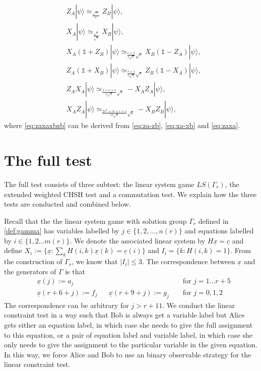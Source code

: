 \documentclass[11pt,letterpaper]{article}
\newcommand{\ket}[1]{|#1\rangle}
\newcommand{\1}{\mathbb{1}}
\newcommand{\LS}{LS}
\newcommand{\nr}{n(r)}
\newcommand{\mr}{m(r)}
\newcommand{\ux}{\underline{x}}
\newcommand{\uc}{\underline{c}}
\newcommand{\se}{\sqrt{\epsilon}}
\newcommand{\appd}[1]{\simeq_{#1}}
\theoremstyle{definition}
\begin{document}
\begin{align}
	\label{eq:za-zb}& Z_A\ket{\psi} \appd{\frac{\sqrt{s\epsilon}}{c}} Z_B\ket{\psi},\\
	\label{eq:xa-xb}&X_A\ket{\psi} \appd{\frac{\sqrt{\epsilon}}{\sqrt{s}}} X_B \ket{\psi}, \\
	\label{eq:xazb}&X_A(\1+Z_B)\ket{\psi} \appd{\frac{c+1}{c\sqrt{s}} \se} X_B(\1-Z_A) \ket{\psi},\\
	\label{eq:zaxb}&Z_A(\1+X_B)\ket{\psi} \appd{ \frac{s+1}{c\sqrt{s}} \se} Z_B(\1-X_A) \ket{\psi},\\
	\label{eq:zaxa}&Z_AX_A\ket{\psi} \appd{\frac{1+c+s}{c\sqrt{s}} \se} -X_AZ_A \ket{\psi},\\
	\label{eq:zaxaxbzb}&X_AZ_A \ket{\psi} \appd{\frac{2s^2+cs+c+s}{cs\sqrt{s}} \sqrt{\epsilon}} -X_BZ_B \ket{\psi},
\end{align}
where \cref{eq:zaxaxbzb} can be derived from \cref{eq:za-zb}, \cref{eq:xa-xb} and \cref{eq:zaxa}.
\section{The full test}
\label{sec:full_test}
The full test consists of three subtest: the linear system game $\LS(\Gamma_r)$,
the extended weighted CHSH test and a commutation test. We explain how the three tests are conducted and
combined below.

Recall that the the linear system game with solution group $\Gamma_r$ defined in \cref{def:gamma} has variables labelled by $j \in \{1,2,\dots,\nr\}$ and
equations labelled by $i \in \{1, 2 \dots \mr\}$.
We denote the associated linear system by $H\underline{x} = \uc$ and
define $X_i := \{ \ux : \sum_{k} H(i,k)\ux(k) = \uc(i) \}$ and $I_i = \{ k : H(i,k) = 1\}$.
From the construction of $\Gamma_r$, we know that $| I_i| \leq 3$.
The correspondence between $\ux$ and the generators of $\Gamma$ is that
\begin{align*}
	&\ux(j) := a_j &&&&\text{ for } j = 1 \dots r+5 \\
	&\ux(r+6+j) := f_j&& \ux(r+9+j) := g_j &&\text{ for } j = 0,1,2 
\end{align*} 
The correspondence can be arbitrary for $j > r+11$.
We conduct the linear constraint test in a way such that Bob is always get a variable label
but Alice gets either an equation label, in which case she needs to give the full assignment to this equation,
or a pair of equation label and variable label, in which case she only needs to give the assignment to the particular 
variable in the given equation. In this way, we force Alice and Bob to use an binary observable strategy for the linear constraint 
test. 
\end{document}
